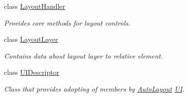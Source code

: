\begin{DoxyCompactItemize}
class \mbox{\hyperlink{class_wpf_handler_1_1_u_i_1_1_auto_layout_1_1_layout_handler}{Layout\+Handler}}
\begin{DoxyCompactList}\small\item\em Provides core methods for layout controls. \end{DoxyCompactList}\item 
class \mbox{\hyperlink{class_wpf_handler_1_1_u_i_1_1_auto_layout_1_1_layout_layer}{Layout\+Layer}}
\begin{DoxyCompactList}\small\item\em Contains data about layout layer to relative element. \end{DoxyCompactList}\item 
class \mbox{\hyperlink{class_wpf_handler_1_1_u_i_1_1_auto_layout_1_1_u_i_descriptor}{U\+I\+Descriptor}}
\begin{DoxyCompactList}\small\item\em Class that provides adopting of members by \mbox{\hyperlink{namespace_wpf_handler_1_1_u_i_1_1_auto_layout}{Auto\+Layout}} \mbox{\hyperlink{namespace_wpf_handler_1_1_u_i}{UI}}. \end{DoxyCompactList}\end{DoxyCompactItemize}
